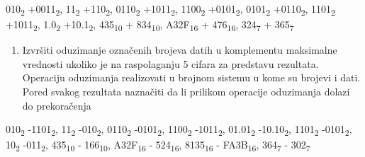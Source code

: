 \documentclass[a4paper,11pt]{article}
\numberwithin{equation}{section}
\begin{document}
010\textsubscript{2} +0011\textsubscript{2}, 11\textsubscript{2} +110\textsubscript{2}, 0110\textsubscript{2} +1011\textsubscript{2}, 1100\textsubscript{2} +0101\textsubscript{2}, 0101\textsubscript{2} +0110\textsubscript{2}, 1101\textsubscript{2} +1011\textsubscript{2}, 1.0\textsubscript{2} +10.1\textsubscript{2}, 435\textsubscript{10} + 834\textsubscript{10}, A32F\textsubscript{16} + 476\textsubscript{16}, 324\textsubscript{7} + 365\textsubscript{7}



\begin{enumerate}[label=\alph*),start=2,leftmargin=*]
\item Izvršiti oduzimanje označenih brojeva datih u komplementu maksimalne vrednosti ukoliko je na raspolaganju 5 cifara za predstavu rezultata. Operaciju oduzimanja realizovati u brojnom sistemu u kome su brojevi i dati. Pored svakog rezultata naznačiti da li prilikom operacije oduzimanja dolazi do prekoračenja

\end{enumerate}


010\textsubscript{2} -1101\textsubscript{2}, 11\textsubscript{2} -010\textsubscript{2}, 0110\textsubscript{2} -0101\textsubscript{2}, 1100\textsubscript{2} -1011\textsubscript{2}, 01.01\textsubscript{2} -10.10\textsubscript{2}, 1101\textsubscript{2} -0101\textsubscript{2}, 10\textsubscript{2} -011\textsubscript{2}, 435\textsubscript{10} - 166\textsubscript{10}, A32F\textsubscript{16} - 524\textsubscript{16}, 8135\textsubscript{16} - FA3B\textsubscript{16}, 364\textsubscript{7} - 302\textsubscript{7}
\end{document}
